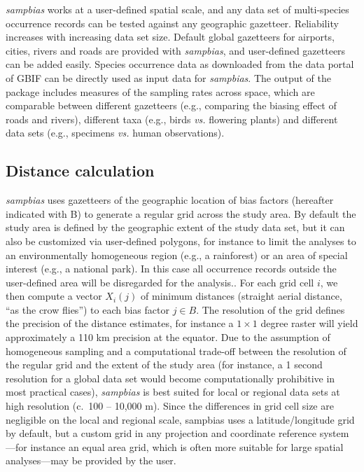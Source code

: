 \documentclass[
  12pt,
]{article}
\begin{document}
\emph{sampbias} works at a user-defined spatial scale, and any data set of multi-species occurrence records can be tested against any geographic gazetteer. Reliability increases with increasing data set size. Default global gazetteers for airports, cities, rivers and roads are provided with \emph{sampbias}, and user-defined gazetteers can be added easily. Species occurrence data as downloaded from the data portal of GBIF can be directly used as input data for \emph{sampbias}. The output of the package includes measures of the sampling rates across space, which are comparable between different gazetteers (e.g., comparing the biasing effect of roads and rivers), different taxa (e.g., birds \emph{vs.} flowering plants) and different data sets (e.g., specimens \emph{vs.} human observations).

\hypertarget{distance-calculation}{%
\subsection{Distance calculation}\label{distance-calculation}}

\emph{sampbias} uses gazetteers of the geographic location of bias factors (hereafter indicated with B) to generate a regular grid across the study area. By default the study area is defined by the geographic extent of the study data set, but it can also be customized via user-defined polygons, for instance to limit the analyses to an environmentally homogeneous region (e.g., a rainforest) or an area of special interest (e.g., a national park). In this case all occurrence records outside the user-defined area will be disregarded for the analysis.. For each grid cell \(i\), we then compute a vector \(X_i(j)\) of minimum distances (straight aerial distance, ``as the crow flies'') to each bias factor \(j \in B\). The resolution of the grid defines the precision of the distance estimates, for instance a \(1 \times 1\) degree raster will yield approximately a 110 km precision at the equator. Due to the assumption of homogeneous sampling and a computational trade-off between the resolution of the regular grid and the extent of the study area (for instance, a 1 second resolution for a global data set would become computationally prohibitive in most practical cases), \emph{sampbias} is best suited for local or regional data sets at high resolution (c.~100 -- 10,000 m). Since the differences in grid cell size are negligible on the local and regional scale, sampbias uses a latitude/longitude grid by default, but a custom grid in any projection and coordinate reference system---for instance an equal area grid, which is often more suitable for large spatial analyses---may be provided by the user.
\end{document}
